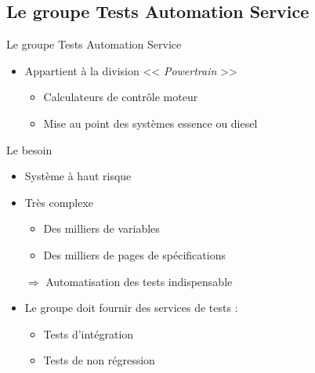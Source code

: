\subsection{Le groupe Tests Automation Service}
\begin{frame}{Le groupe Tests Automation Service}

	\begin{itemize}
		\item Appartient à la division << \textit{Powertrain} >>
			\begin{itemize}
				\item Calculateurs de contrôle moteur
				\item Mise au point des systèmes essence ou diesel
			\end{itemize}
	\end{itemize}
	
	\vfill
	\pause
	\begin{block}{Le besoin}
		\begin{itemize}
			\item Système à haut risque 
			\item Très complexe
			\begin{itemize}
				\item Des milliers de variables
				\item Des milliers de pages de spécifications
			\end{itemize}
			$\Rightarrow$ Automatisation des tests indispensable
		\end{itemize}
	\end{block}
	\pause
	\begin{itemize}
		\item Le groupe doit fournir des services de tests :
			\begin{itemize}
				\item Tests d'intégration
				\item Tests de non régression
			\end{itemize}
	\end{itemize}
\end{frame}
